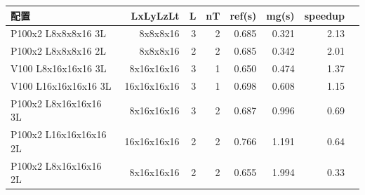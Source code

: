 \begin{tabular}{l|rrrrrrr}
\hline
配置 & LxLyLzLt & L & nT & ref(s) & mg(s) & speedup \\
\hline
P100x2 L8x8x8x16 3L & 8x8x8x16 & 3 & 2 & 0.685 & 0.321 & 2.13 \\
P100x2 L8x8x8x16 2L & 8x8x8x16 & 2 & 2 & 0.685 & 0.342 & 2.01 \\
V100 L8x16x16x16 3L & 8x16x16x16 & 3 & 1 & 0.650 & 0.474 & 1.37 \\
V100 L16x16x16x16 3L & 16x16x16x16 & 3 & 1 & 0.698 & 0.608 & 1.15 \\
P100x2 L8x16x16x16 3L & 8x16x16x16 & 3 & 2 & 0.687 & 0.996 & 0.69 \\
P100x2 L16x16x16x16 2L & 16x16x16x16 & 2 & 2 & 0.766 & 1.191 & 0.64 \\
P100x2 L8x16x16x16 2L & 8x16x16x16 & 2 & 2 & 0.655 & 1.994 & 0.33 \\
\hline
\end{tabular}
